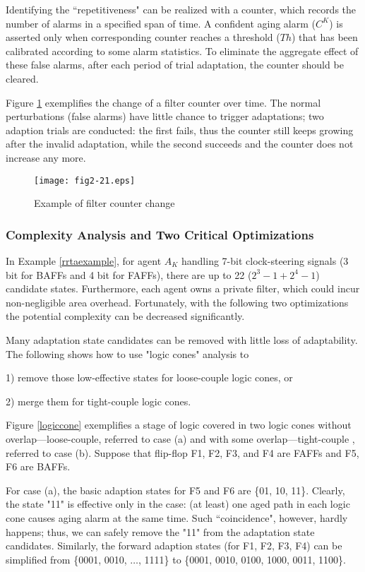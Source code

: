 Identifying the ``repetitiveness" can be realized with a counter, which records the number of alarms in a specified span of time.  A confident aging alarm ($C^K$) is asserted only when corresponding counter reaches a threshold ($Th$) that has been calibrated according to some alarm statistics. To eliminate the aggregate effect of these false alarms, after each period of trial adaptation, the counter should be cleared.

Figure \ref{synadp} exemplifies the change of a filter counter over time. The normal perturbations (false alarms) have little chance to trigger adaptations; two adaption trials are conducted: the first fails, thus the counter still keeps growing after the invalid adaptation, while the second succeeds and the counter does not increase any more.

\begin{figure}[t]
\centering
\texttt{[image: fig2-21.eps]}%
   \caption{Example of filter counter change}\label{synadp}
\end{figure}


\subsubsection{Complexity Analysis and Two Critical Optimizations}\label{section_complexity} In Example \ref{rrtaexample}, for agent $A_K$ handling 7-bit clock-steering signals (3 bit for BAFFs and 4 bit for FAFFs), there are up to 22 ($2^3-1+2^4-1$) candidate states. Furthermore, each agent owns a private filter, which could incur non-negligible area overhead. Fortunately, with the following two optimizations the potential complexity can be decreased significantly.

Many adaptation state candidates can be removed with little loss of adaptability. The following shows how to use "logic cones" analysis to

1) remove those low-effective states for loose-couple logic cones, or

2) merge them for tight-couple logic cones.

\exmp Figure \ref{logiccone} exemplifies a stage of logic covered in two logic cones without overlap---loose-couple, referred to case (a) and with some overlap---tight-couple , referred to case (b). Suppose that flip-flop F1, F2, F3, and F4 are FAFFs and F5, F6 are BAFFs.

For case (a), the basic adaption states for F5 and F6 are \{01, 10, 11\}. Clearly, the state "11" is effective only in the case: (at least) one aged path in each logic cone causes aging alarm at the same time. Such ``coincidence", however, hardly happens; thus, we can safely remove the "11" from the adaptation state candidates. Similarly, the forward adaption states (for F1, F2, F3, F4) can be simplified from \{0001, 0010, $\ldots$, 1111\} to \{0001, 0010, 0100, 1000, 0011, 1100\}.

